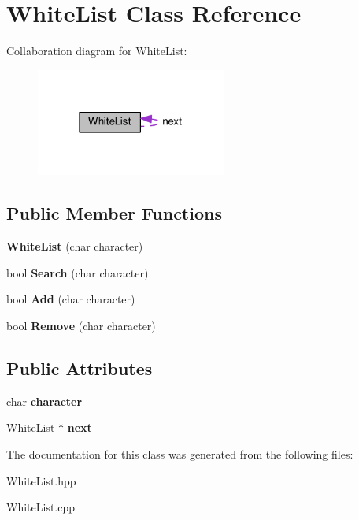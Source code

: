 \hypertarget{classWhiteList}{}\section{White\+List Class Reference}
\label{classWhiteList}


Collaboration diagram for White\+List\+:
\nopagebreak
\begin{figure}[H]
\begin{center}
\leavevmode
\includegraphics[width=178pt]{classWhiteList__coll__graph}
\end{center}
\end{figure}
\subsection*{Public Member Functions}
\begin{DoxyCompactItemize}
\item 
\hypertarget{classWhiteList_a7f6055f34248dd35e9deb7a360c33bf5}{}{\bfseries White\+List} (char character)\label{classWhiteList_a7f6055f34248dd35e9deb7a360c33bf5}

\item 
\hypertarget{classWhiteList_ace4e525a425227e38f28b40992d64bb2}{}bool {\bfseries Search} (char character)\label{classWhiteList_ace4e525a425227e38f28b40992d64bb2}

\item 
\hypertarget{classWhiteList_a069f041f5691be0f3af4fa7ae4b67e99}{}bool {\bfseries Add} (char character)\label{classWhiteList_a069f041f5691be0f3af4fa7ae4b67e99}

\item 
\hypertarget{classWhiteList_ab01ec4184004cbab82f7eac1ef0643f9}{}bool {\bfseries Remove} (char character)\label{classWhiteList_ab01ec4184004cbab82f7eac1ef0643f9}

\end{DoxyCompactItemize}
\subsection*{Public Attributes}
\begin{DoxyCompactItemize}
\item 
\hypertarget{classWhiteList_a833dce49b170048ce93213db97552ce1}{}char {\bfseries character}\label{classWhiteList_a833dce49b170048ce93213db97552ce1}

\item 
\hypertarget{classWhiteList_ad1dac708f4bc9ff9a97ce54061b4cc97}{}\hyperlink{classWhiteList}{White\+List} $\ast$ {\bfseries next}\label{classWhiteList_ad1dac708f4bc9ff9a97ce54061b4cc97}

\end{DoxyCompactItemize}


The documentation for this class was generated from the following files\+:\begin{DoxyCompactItemize}
\item 
White\+List.\+hpp\item 
White\+List.\+cpp\end{DoxyCompactItemize}
